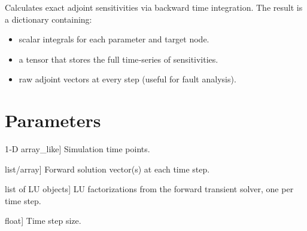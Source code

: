 \documentclass[letterpaper,10pt,english]{sphinxmanual}
\begin{document}

\begin{fulllineitems}
\label{\detokenize{adjoint_engine:AdjointEngine.compute_transient}}
\pysigstartsignatures
\pysiglinewithargsret
{}
{\sphinxparamcomma {}\sphinxparamcomma {}\sphinxparamcomma {}\sphinxparamcomma {}}
{}
\pysigstopsignatures
\sphinxAtStartPar
Calculates exact  adjoint sensitivities via backward time integration.
The result is a dictionary containing:
\begin{itemize}
\item {} 
\sphinxAtStartPar
{} \textendash{} scalar integrals for each parameter and target node.

\item {} 
\sphinxAtStartPar
{} \textendash{} a  tensor that stores the full time‑series of sensitivities.

\item {} 
\sphinxAtStartPar
{} \textendash{} raw adjoint vectors at every step (useful for fault analysis).

\end{itemize}


\section{Parameters}
\label{\detokenize{adjoint_engine:id1}}\begin{description}
\sphinxlineitem{time\_array}{[}1‑D array\_like{]}
\sphinxAtStartPar
Simulation time points.

\sphinxlineitem{V\_forward}{[}list/array{]}
\sphinxAtStartPar
Forward solution vector(s) at each time step.

\sphinxlineitem{list\_of\_lus}{[}list of LU objects{]}
\sphinxAtStartPar
LU factorizations from the forward transient solver, one per time step.

\sphinxlineitem{dt}{[}float{]}
\sphinxAtStartPar
Time step size.


\end{description}
\end{fulllineitems}
\end{document}
